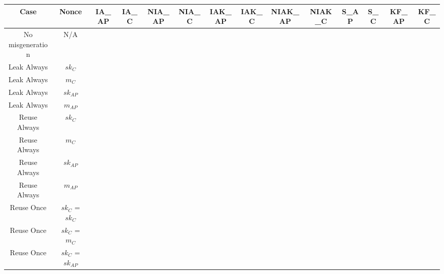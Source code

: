 \documentclass[crop]{standalone}
\newcommand{\noattack}{\color{ForestGreen}\usym{2713}\color{black}}
\newcommand{\attack}{\color{red}\usym{2717}\color{black}}
\begin{document}
\parbox{30cm}{
\begin{tabular}{|c|c|c|c|c|c|c|c|c|c|c|c|c|c|}
\hline
Case & Nonce & IA\_AP & IA\_C & NIA\_AP & NIA\_C & IAK\_AP & IAK\_C & NIAK\_AP & NIAK\_C & S\_AP & S\_C & KF\_AP & KF\_C \\ \hline
No misgeneration & N/A & \noattack & \attack & \noattack & \attack & \noattack & \attack & \noattack & \attack & \noattack & \noattack & \noattack & \attack\\ \hline
Leak Always & $sk_C$ & \attack & \attack & \attack & \attack & \attack & \attack & \attack & \attack & \attack & \attack & \noattack & \attack\\ \hline
Leak Always & $m_C$ & \attack & \attack & \attack & \attack & \attack & \attack & \attack & \attack & \attack & \attack & \noattack & \attack\\ \hline
Leak Always & $sk_{AP}$ & \attack & \attack & \attack & \attack & \attack & \attack & \attack & \attack & \attack & \attack & \attack & \attack\\ \hline
Leak Always & $m_{AP}$ & \attack & \attack & \attack & \attack & \attack & \attack & \attack & \attack & \attack & \attack & \noattack & \attack\\ \hline
Reuse Always & $sk_C$ & \noattack & \attack & \noattack & \attack & \noattack & \attack & \noattack & \attack & \noattack & \noattack & \noattack & \attack\\ \hline
Reuse Always & $m_C$ & \noattack & \attack & \noattack & \attack & \noattack & \attack & \noattack & \attack & \noattack & \noattack & \noattack & \attack\\ \hline
Reuse Always & $sk_{AP}$ & \noattack & \attack & \noattack & \attack & \noattack & \attack & \noattack & \attack & \noattack & \noattack & \noattack & \attack\\ \hline
Reuse Always & $m_{AP}$ & \noattack & \attack & \noattack & \attack & \noattack & \attack & \noattack & \attack & \noattack & \noattack & \noattack & \attack\\ \hline
Reuse Once & $sk_C$ = $sk_C$ & \noattack & \attack & \noattack & \attack & \noattack & \attack & \noattack & \attack & \noattack & \noattack & \noattack & \attack\\ \hline
Reuse Once & $sk_C$ = $m_C$ & \noattack & \attack & \noattack & \attack & \noattack & \attack & \noattack & \attack & \noattack & \noattack & \noattack & \attack\\ \hline
Reuse Once & $sk_C$ = $sk_{AP}$ & \noattack & \attack & \noattack & \attack & \noattack & \attack & \noattack & \attack & \noattack & \noattack & \noattack & \attack\\ \hline

\end{tabular}}
\end{document}
